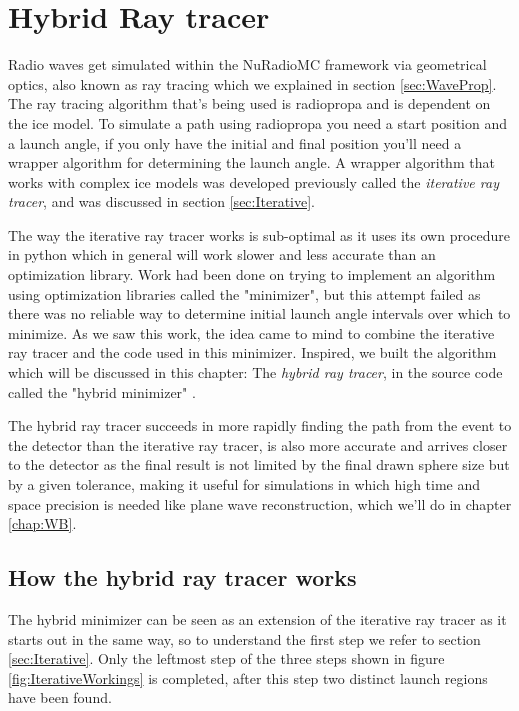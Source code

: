 \chapter{Hybrid Ray tracer}
\label{chapter:hybrid}
Radio waves get simulated within the NuRadioMC framework via geometrical
optics, also known as ray tracing which we explained in section \ref{sec:WaveProp}.
The ray tracing algorithm that's being used is radiopropa and is dependent on
the ice model. To simulate a path using radiopropa you need a start position 
and a launch angle, if you only have the initial and final position you'll need
a wrapper algorithm for determining the launch angle.  
A wrapper algorithm that works with complex ice models was developed previously
called the \textit{iterative ray tracer}\cite{2022icrc.confE1027O}, and was
discussed in section \ref{sec:Iterative}.

The way the iterative ray tracer works is sub-optimal as it uses its own
procedure in python which in general will work slower and less accurate than an
optimization library. Work had been done on trying to implement an algorithm
using optimization libraries called the "minimizer", but this attempt failed as
there was no reliable way to determine initial launch angle intervals over
which to minimize.  As we saw this work, the idea came to mind to combine the
iterative ray tracer and the code used in this minimizer. Inspired, we
built the algorithm which will be discussed in this chapter: The \textit{hybrid ray
tracer}, in the source code called the "hybrid minimizer" \cite{hybrid}. 

The hybrid ray tracer succeeds in more rapidly finding the path from the event
to the detector than the iterative ray tracer, is also more accurate and
arrives closer to the detector as the final result is not limited by the final
drawn sphere size but by a given tolerance, making it useful for simulations in
which high time and space precision is needed like plane wave reconstruction,
which we'll do in chapter \ref{chap:WB}.

\section{How the hybrid ray tracer works}
The hybrid minimizer can be seen as an extension of the iterative ray tracer as
it starts out in the same way, so to understand the first step we refer to section 
\ref{sec:Iterative}. Only the leftmost step of the three steps shown in figure
\ref{fig:IterativeWorkings} is completed, after this step two distinct launch regions
have been found.

